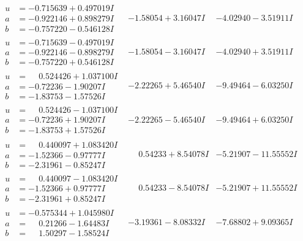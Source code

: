 \documentclass[1p]{elsarticle_modified}
\theoremstyle{definition}
\begin{document}
$$\begin{array}{c|c|c}
\begin{aligned}
u &= -0.715639 + 0.497019 I \\
a &= -0.922146 + 0.898279 I \\
b &= -0.757220 - 0.546128 I\end{aligned}
 & -1.58054 + 3.16047 I & -4.02940 - 3.51911 I \\ \hline\begin{aligned}
u &= -0.715639 - 0.497019 I \\
a &= -0.922146 - 0.898279 I \\
b &= -0.757220 + 0.546128 I\end{aligned}
 & -1.58054 - 3.16047 I & -4.02940 + 3.51911 I \\ \hline\begin{aligned}
u &= \phantom{-}0.524426 + 1.037100 I \\
a &= -0.72236 - 1.90207 I \\
b &= -1.83753 - 1.57526 I\end{aligned}
 & -2.22265 + 5.46540 I & -9.49464 - 6.03250 I \\ \hline\begin{aligned}
u &= \phantom{-}0.524426 - 1.037100 I \\
a &= -0.72236 + 1.90207 I \\
b &= -1.83753 + 1.57526 I\end{aligned}
 & -2.22265 - 5.46540 I & -9.49464 + 6.03250 I \\ \hline\begin{aligned}
u &= \phantom{-}0.440097 + 1.083420 I \\
a &= -1.52366 - 0.97777 I \\
b &= -2.31961 - 0.85247 I\end{aligned}
 & \phantom{-}0.54233 + 8.54078 I & -5.21907 - 11.55552 I \\ \hline\begin{aligned}
u &= \phantom{-}0.440097 - 1.083420 I \\
a &= -1.52366 + 0.97777 I \\
b &= -2.31961 + 0.85247 I\end{aligned}
 & \phantom{-}0.54233 - 8.54078 I & -5.21907 + 11.55552 I \\ \hline\begin{aligned}
u &= -0.575344 + 1.045980 I \\
a &= \phantom{-}0.21266 - 1.64483 I \\
b &= \phantom{-}1.50297 - 1.58524 I\end{aligned}
 & -3.19361 - 8.08332 I & -7.68802 + 9.09365 I \\ \hline\begin{aligned}

\end{aligned}
\end{array}$$
\end{document}
